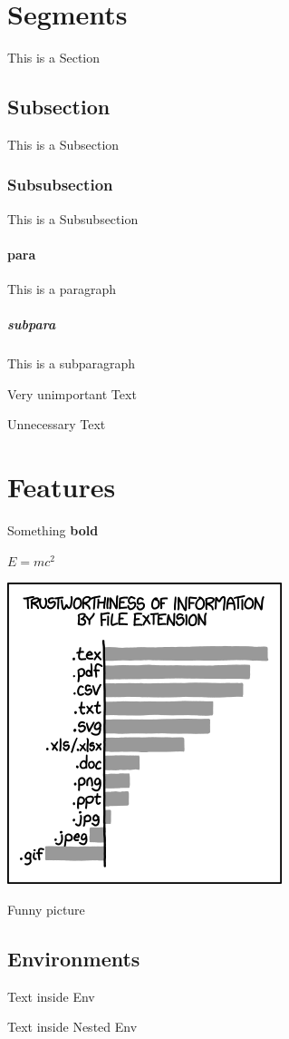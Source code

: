 \section{Segments}
This is a Section

\subsection{Subsection}
This is a Subsection

\subsubsection{Subsubsection}
This is a Subsubsection

\paragraph{para}
This is a paragraph

\subparagraph{subpara}
This is a subparagraph

Very unimportant Text

Unnecessary Text

\section{Features}
Something \textbf{bold}


$E = mc^2$

\includegraphics{image.png}
\caption{Funny picture}
\subsection{Environments}
\begin{Some_Env}
Text inside Env

\begin{Nested_Env}
Text inside Nested Env

\end{Nested_Env}
\end{Some_Env}
